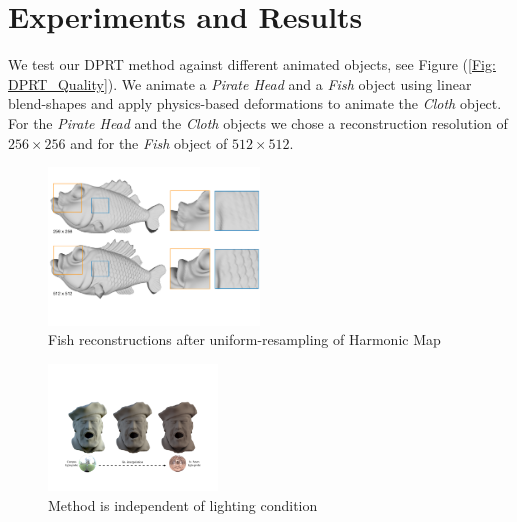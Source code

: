 \section{Experiments and Results}
We test our DPRT method against different animated objects,  see Figure (\ref{Fig: DPRT_Quality}). We animate a \textit{Pirate Head} and a \textit{Fish} object using linear blend-shapes and apply physics-based deformations to animate the \textit{Cloth} object.\\ 
For the \textit{Pirate Head} and the \textit{Cloth} objects we chose a reconstruction resolution of $256 \times 256$ and for the \textit{Fish } object of $512 \times 512$.
\begin{figure}[H]
  \centering
    \includegraphics[width=0.5\textwidth]{Figures/fish}
     \caption{Fish reconstructions after uniform-resampling of Harmonic Map}
     \label{Fig: Fish Reconstruction}
\end{figure}
\begin{figure}[H]
  \centering
    \includegraphics[width=0.4\textwidth]{Figures/varying_lighting}
     \caption{Method is independent of lighting condition}
     \label{Fig: Varying lighting}
\end{figure}
